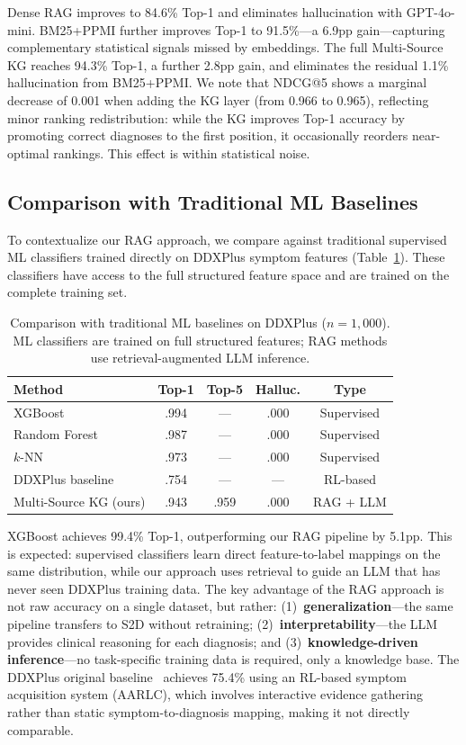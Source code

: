 \documentclass[runningheads]{llncs}
\begin{document}
Dense RAG improves to 84.6\% Top-1 and eliminates hallucination with GPT-4o-mini. BM25+PPMI further improves Top-1 to 91.5\%---a 6.9pp gain---capturing complementary statistical signals missed by embeddings. The full Multi-Source KG reaches 94.3\% Top-1, a further 2.8pp gain, and eliminates the residual 1.1\% hallucination from BM25+PPMI. We note that NDCG@5 shows a marginal decrease of 0.001 when adding the KG layer (from 0.966 to 0.965), reflecting minor ranking redistribution: while the KG improves Top-1 accuracy by promoting correct diagnoses to the first position, it occasionally reorders near-optimal rankings. This effect is within statistical noise.

\subsection{Comparison with Traditional ML Baselines}
\label{sec:ml_baselines}

To contextualize our RAG approach, we compare against traditional supervised ML classifiers trained directly on DDXPlus symptom features (Table~\ref{tab:ml_baselines}). These classifiers have access to the full structured feature space and are trained on the complete training set.

\begin{table}[t]
\centering
\caption{Comparison with traditional ML baselines on DDXPlus ($n{=}1{,}000$). ML classifiers are trained on full structured features; RAG methods use retrieval-augmented LLM inference.}
\label{tab:ml_baselines}
\begin{tabular}{lcccc}
\toprule
\textbf{Method} & \textbf{Top-1} & \textbf{Top-5} & \textbf{Halluc.} & \textbf{Type} \\
\midrule
XGBoost         & .994 & --- & .000 & Supervised \\
Random Forest   & .987 & --- & .000 & Supervised \\
$k$-NN          & .973 & --- & .000 & Supervised \\
DDXPlus baseline~\cite{fansi2022ddxplus} & .754 & --- & --- & RL-based \\
\midrule
Multi-Source KG (ours) & .943 & .959 & .000 & RAG + LLM \\
\bottomrule
\end{tabular}
\end{table}

XGBoost achieves 99.4\% Top-1, outperforming our RAG pipeline by 5.1pp. This is expected: supervised classifiers learn direct feature-to-label mappings on the same distribution, while our approach uses retrieval to guide an LLM that has never seen DDXPlus training data. The key advantage of the RAG approach is not raw accuracy on a single dataset, but rather: (1)~\textbf{generalization}---the same pipeline transfers to S2D without retraining; (2)~\textbf{interpretability}---the LLM provides clinical reasoning for each diagnosis; and (3)~\textbf{knowledge-driven inference}---no task-specific training data is required, only a knowledge base. The DDXPlus original baseline~\cite{fansi2022ddxplus} achieves 75.4\% using an RL-based symptom acquisition system (AARLC), which involves interactive evidence gathering rather than static symptom-to-diagnosis mapping, making it not directly comparable.
\end{document}
